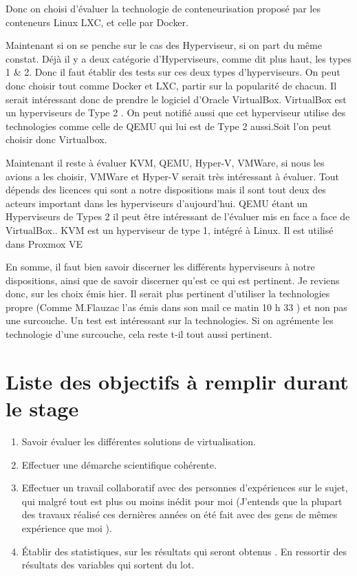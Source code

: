\documentclass[french]{article}
\begin{document}
Donc on choisi d'évaluer la technologie de conteneurisation proposé par les conteneurs Linux LXC, et celle par Docker.

Maintenant si on se penche sur le cas des Hyperviseur, si on part du même constat. Déjà il y a deux catégorie d'Hyperviseurs, comme dit plus haut, les types 1 \& 2. 
Donc il faut établir des tests sur ces deux types d'hyperviseurs. On peut donc choisir tout comme Docker et LXC, partir sur la popularité de chacun. Il serait intéressant donc de prendre le logiciel d'Oracle VirtualBox. VirtualBox est un hyperviseurs de Type 2 . On peut notifié aussi que cet hyperviseur utilise des technologies comme celle de QEMU qui lui est de Type 2 aussi.Soit l'on peut choisir donc Virtualbox.

Maintenant il reste à évaluer KVM, QEMU, Hyper-V, VMWare, si nous les avions a les choisir, VMWare et Hyper-V serait très intéressant à évaluer. Tout dépends des licences qui sont a notre dispositions mais il sont tout deux des acteurs important dans les hyperviseurs d'aujourd'hui. QEMU étant un Hyperviseurs de Types 2 il peut être intéressant de l'évaluer mis en face a face de VirtualBox.. KVM est un hyperviseur de type 1, intégré à Linux. Il est utilisé dans Proxmox VE

En somme, il faut bien savoir discerner les différents hyperviseurs à notre dispositions, ainsi que de savoir discerner qu'est ce qui est pertinent. Je reviens donc, sur les choix émis hier. Il serait plus pertinent d'utiliser la technologies propre (Comme M.Flauzac l'as émis dans son mail ce matin 10 h 33 ) et non pas une surcouche. Un test est intéressant sur la technologies. Si on agrémente les technologie d'une surcouche, cela reste t-il tout aussi pertinent.    

\section{Liste des objectifs à remplir durant le stage}
\begin{enumerate}
	\item Savoir évaluer les différentes solutions de virtualisation. 	
	\item Effectuer une démarche scientifique cohérente.
	\item Effectuer un travail collaboratif avec des personnes d’expériences sur le sujet, qui malgré tout est plus ou moins inédit pour moi (J’entends que la plupart des travaux réalisé ces dernières années on été fait avec des gens de mêmes expérience que moi ).
	\item Établir des statistiques, sur les résultats qui seront obtenus . En ressortir des résultats des variables qui sortent du lot.
\end{enumerate}
\end{document}
